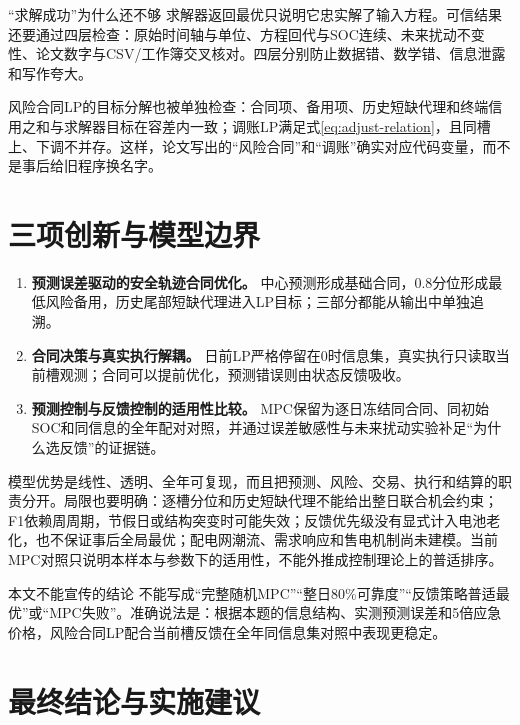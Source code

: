 \documentclass[UTF8,fontset=fandol,a4paper,11pt]{ctexart}
\begin{document}
\begin{plainbox}{“求解成功”为什么还不够}
求解器返回最优只说明它忠实解了输入方程。可信结果还要通过四层检查：原始时间轴与单位、方程回代与SOC连续、未来扰动不变性、论文数字与CSV/工作簿交叉核对。四层分别防止数据错、数学错、信息泄露和写作夸大。
\end{plainbox}

风险合同LP的目标分解也被单独检查：合同项、备用项、历史短缺代理和终端信用之和与求解器目标在容差内一致；调账LP满足式\eqref{eq:adjust-relation}，且同槽上、下调不并存。这样，论文写出的“风险合同”和“调账”确实对应代码变量，而不是事后给旧程序换名字。

\section{三项创新与模型边界}

\begin{enumerate}[label=（\arabic*）]
  \item \textbf{预测误差驱动的安全轨迹合同优化。} 中心预测形成基础合同，0.8分位形成最低风险备用，历史尾部短缺代理进入LP目标；三部分都能从输出中单独追溯。
  \item \textbf{合同决策与真实执行解耦。} 日前LP严格停留在0时信息集，真实执行只读取当前槽观测；合同可以提前优化，预测错误则由状态反馈吸收。
  \item \textbf{预测控制与反馈控制的适用性比较。} MPC保留为逐日冻结同合同、同初始SOC和同信息的全年配对对照，并通过误差敏感性与未来扰动实验补足“为什么选反馈”的证据链。
\end{enumerate}

模型优势是线性、透明、全年可复现，而且把预测、风险、交易、执行和结算的职责分开。局限也要明确：逐槽分位和历史短缺代理不能给出整日联合机会约束；F1依赖周周期，节假日或结构突变时可能失效；反馈优先级没有显式计入电池老化，也不保证事后全局最优；配电网潮流、需求响应和售电机制尚未建模。当前MPC对照只说明本样本与参数下的适用性，不能外推成控制理论上的普适排序。

\begin{limitbox}{本文不能宣传的结论}
不能写成“完整随机MPC”“整日80\%可靠度”“反馈策略普适最优”或“MPC失败”。准确说法是：根据本题的信息结构、实测预测误差和5倍应急价格，风险合同LP配合当前槽反馈在全年同信息集对照中表现更稳定。
\end{limitbox}

\section{最终结论与实施建议}
\end{document}
